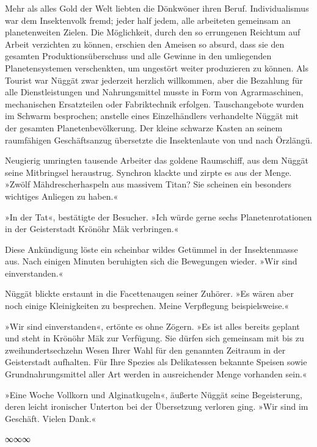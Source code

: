 Mehr als alles Gold der Welt liebten die Dönkwöner ihren Beruf. Individualismus war dem Insektenvolk fremd; jeder half jedem, alle arbeiteten gemeinsam an planetenweiten Zielen. Die Möglichkeit, durch den so errungenen Reichtum auf Arbeit verzichten zu können, erschien den Ameisen so absurd, dass sie den gesamten Produktionsüberschuss und alle Gewinne in den umliegenden Planetensystemen verschenkten, um ungestört weiter produzieren zu können. Als Tourist war Nüggät zwar jederzeit herzlich willkommen, aber die Bezahlung für alle Dienstleistungen und Nahrungsmittel musste in Form von Agrarmaschinen, mechanischen Ersatzteilen oder Fabriktechnik erfolgen. Tauschangebote wurden im Schwarm besprochen; anstelle eines Einzelhändlers verhandelte Nüggät mit der gesamten Planetenbevölkerung. Der kleine schwarze Kasten an seinem raumfähigen Geschäftsanzug übersetzte die Insektenlaute von und nach Örzlängü.

Neugierig umringten tausende Arbeiter das goldene Raumschiff, aus dem Nüggät seine Mitbringsel heraustrug. Synchron klackte und zirpte es aus der Menge. »Zwölf Mähdrescherhaspeln aus massivem Titan? Sie scheinen ein besonders wichtiges Anliegen zu haben.«

»In der Tat«, bestätigte der Besucher. »Ich würde gerne sechs Planetenrotationen in der Geisterstadt Krönöhr Mäk verbringen.«

Diese Ankündigung löste ein scheinbar wildes Getümmel in der Insektenmasse aus. Nach einigen Minuten beruhigten sich die Bewegungen wieder. »Wir sind einverstanden.«

Nüggät blickte erstaunt in die Facettenaugen seiner Zuhörer. »Es wären aber noch einige Kleinigkeiten zu besprechen. Meine Verpflegung beispielsweise.«

»Wir sind einverstanden«, ertönte es ohne Zögern. »Es ist alles bereits geplant und steht in Krönöhr Mäk zur Verfügung. Sie dürfen sich gemeinsam mit bis zu zweihundertsechzehn Wesen Ihrer Wahl für den genannten Zeitraum in der Geisterstadt aufhalten. Für Ihre Spezies als Delikatessen bekannte Speisen sowie Grundnahrungsmittel aller Art werden in ausreichender Menge vorhanden sein.«

»Eine Woche Vollkorn und Alginatkugeln«, äußerte Nüggät seine Begeisterung, deren leicht ironischer Unterton bei der Übersetzung verloren ging. »Wir sind im Geschäft. Vielen Dank.«

\begin{center}
∞∞∞
\end{center}

